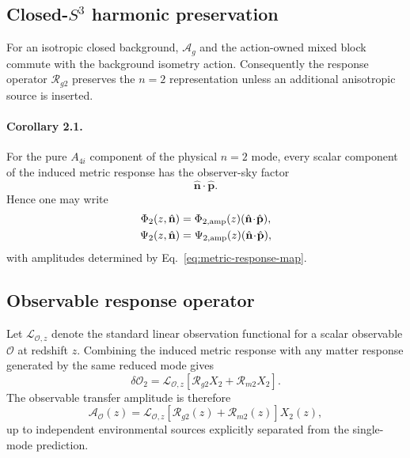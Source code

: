 \subsection{Closed-$S^3$ harmonic preservation}

For an isotropic closed background, $\mathcal A_g$ and the action-owned mixed
block commute with the background isometry action.  Consequently the
response operator $\mathcal R_{g2}$ preserves the $n=2$ representation unless
an additional anisotropic source is inserted.

\paragraph{Corollary 2.1.}
For the pure $A_{4i}$ component of the physical $n=2$ mode, every scalar
component of the induced metric response has the observer-sky factor
\begin{equation}
\hat{\mathbf n}\!\cdot\!\hat{\mathbf p}.
\end{equation}
Hence one may write
\begin{align}
\Phi_2(z,\hat{\mathbf n})
&=
\Phi_{2,\rm amp}(z)
(\hat{\mathbf n}\!\cdot\!\hat{\mathbf p}),
\\
\Psi_2(z,\hat{\mathbf n})
&=
\Psi_{2,\rm amp}(z)
(\hat{\mathbf n}\!\cdot\!\hat{\mathbf p}),
\label{eq:metric-potential-factorization}
\end{align}
with amplitudes determined by
Eq.~\eqref{eq:metric-response-map}.

\subsection{Observable response operator}

Let $\mathcal L_{\mathcal O,z}$ denote the standard linear observation
functional for a scalar observable $\mathcal O$ at redshift $z$.  Combining
the induced metric response with any matter response generated by the same
reduced mode gives
\begin{equation}
\delta\mathcal O_2
=
\mathcal L_{\mathcal O,z}
\left[
\mathcal R_{g2}X_2
+
\mathcal R_{m2}X_2
\right].
\label{eq:observable-response-operator}
\end{equation}
The observable transfer amplitude is therefore
\begin{equation}
\boxed{
\mathcal A_{\mathcal O}(z)
=
\mathcal L_{\mathcal O,z}
\left[
\mathcal R_{g2}(z)
+
\mathcal R_{m2}(z)
\right]X_2(z),
}
\label{eq:observable-amplitude-from-bhsm}
\end{equation}
up to independent environmental sources explicitly separated from the
single-mode prediction.

